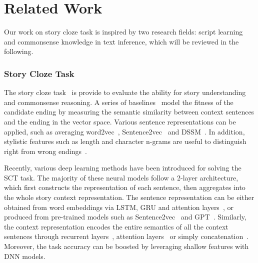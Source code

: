 \section{Related Work}
\label{sec:related}

Our work on story cloze task is inspired by two research fields: script learning and commonsense knowledge in text inference, which will be reviewed in the following.

\subsubsection*{Story Cloze Task}
The story cloze task~\cite{mostafazadeh2016corpus} is provide 
to evaluate the ability for story understanding and 
commonsense reasoning. A series of baselines~\cite{mihaylov2017story,mostafazadeh2016story}
model the fitness of the candidate ending
by measuring the semantic similarity between context sentences 
and the ending in the vector space.
Various sentence representations can be applied,
such as averaging word2vec~\cite{mikolov2013distributed},
Sentence2vec~\cite{kiros2015skip} and DSSM~\cite{huang2013learning}.
In addition, stylistic features such as length and
character n-grams are useful to distinguish
right from wrong endings~\cite{schwartz2017story}. 

Recently, various deep learning methods have been introduced for
solving the SCT task.
The majority of these neural models follow a 2-layer architecture,
which first constructs the representation of each sentence,
then aggregates into the whole story context representation.
The sentence representation can be either obtained from word embeddings
via LSTM, GRU and attention layers~\cite{wang2017conditional,zhou2019story},
or produced from pre-trained models such as
Sentence2vec~\cite{roemmele2017rnn,srinivasan2018simple} and
GPT~\cite{radford2018improving,chen2018incorporating}.
Similarly, the context representation encodes the entire semantics
of all the context sentences through recurrent layers~\cite{cai2017pay},
attention layers~\cite{li2018multi}
or simply concatenation~\cite{bugert2017lsdsem}.
Moreover, the task accuracy can be boosted by leveraging shallow features with DNN models.


